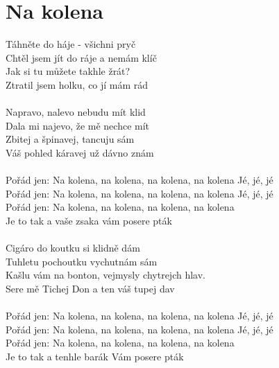 \section{Na kolena}
Táhněte do háje - všichni pryč\\
Chtěl jsem jít do ráje a nemám klíč\\
Jak si tu můžete takhle žrát?\\
Ztratil jsem holku, co jí mám rád\\
\\
Napravo, nalevo nebudu mít klid\\
Dala mi najevo, že mě nechce mít\\
Zbitej a špinavej, tancuju sám\\
Váš pohled káravej už dávno znám\\
\\
Pořád jen: Na kolena, na kolena, na kolena, na kolena Jé, jé, jé\\
Pořád jen: Na kolena, na kolena, na kolena, na kolena Jé, jé, jé\\
Pořád jen: Na kolena, na kolena, na kolena, na kolena\\
Je to tak a vaše zsaka vám posere pták\\
\\
Cigáro do koutku si klidně dám\\
Tuhletu pochoutku vychutnám sám\\
Kašlu vám na bonton, vejmysly chytrejch hlav.\\
Sere mě Tichej Don a ten váš tupej dav\\
\\
Pořád jen: Na kolena, na kolena, na kolena, na kolena Jé, jé, jé\\
Pořád jen: Na kolena, na kolena, na kolena, na kolena Jé, jé, jé\\
Pořád jen: Na kolena, na kolena, na kolena, na kolena\\
Je to tak a tenhle barák Vám posere pták\\